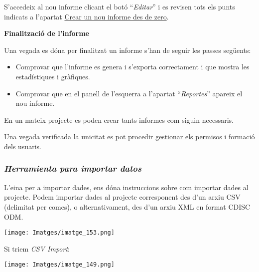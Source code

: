 \documentclass[
]{article}
\providecommand{\tightlist}{%
  \setlength{\itemsep}{0pt}\setlength{\parskip}{0pt}}
\begin{document}
S'accedeix al nou informe clicant el botó ``\emph{Editar}'' i es revisen tots els punts indicats a l'apartat \protect\hyperlink{en13}{Crear un nou informe des de zero}.

\textbf{Finalització de l'informe}

Una vegada es dóna per finalitzat un informe s'han de seguir les passes següents:

\begin{itemize}
\tightlist
\item
  Comprovar que l'informe es genera i s'exporta correctament i que mostra les estadístiques i gràfiques.
\item
  Comprovar que en el panell de l'esquerra a l'apartat ``\emph{Reportes}'' apareix el nou informe.
\end{itemize}

En un mateix projecte es poden crear tants informes com siguin necessaris.

Una vegada verificada la unicitat es pot procedir \protect\hyperlink{en3}{gestionar els permisos} i formació dels usuaris.

\hypertarget{en8}{%
\subsubsection{\texorpdfstring{\textbf{\emph{Herramienta para importar datos}}}{Herramienta para importar datos}}\label{en8}}

L'eina per a importar dades, ens dóna instruccions sobre com importar dades al projecte. Podem importar dades al projecte corresponent des d'un arxiu CSV (delimitat per comes), o alternativament, des d'un arxiu XML en format CDISC ODM.

\texttt{[image: Imatges/imatge\_153.png]}

Si triem \emph{CSV Import}:

\texttt{[image: Imatges/imatge\_149.png]}
\end{document}
